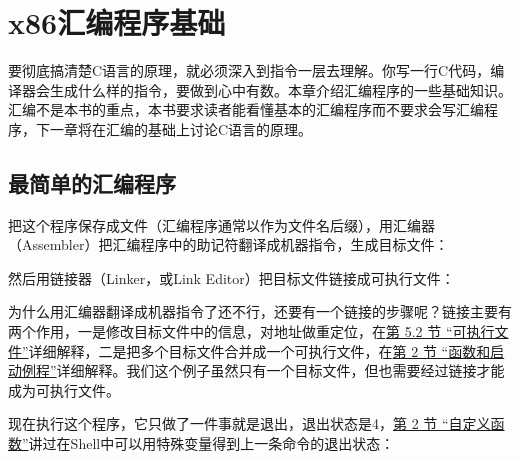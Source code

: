 

\chapter{x86汇编程序基础}
%
要彻底搞清楚C语言的原理，就必须深入到指令一层去理解。你写一行C代码，编译器会生成什么样的指令，要做到心中有数。本章介绍汇编程序的一些基础知识。汇编不是本书的重点，本书要求读者能看懂基本的汇编程序而不要求会写汇编程序，下一章将在汇编的基础上讨论C语言的原理。




\section{最简单的汇编程序}
%



把这个程序保存成文件（汇编程序通常以作为文件名后缀），用汇编器（Assembler）把汇编程序中的助记符翻译成机器指令，生成目标文件：




然后用链接器（Linker，或Link Editor）把目标文件链接成可执行文件：




为什么用汇编器翻译成机器指令了还不行，还要有一个链接的步骤呢？链接主要有两个作用，一是修改目标文件中的信息，对地址做重定位，在\hyperlink{db.ch18s05.id2771639}{第 5.\BookSplit{}2 节 “可执行文件”}详细解释，二是把多个目标文件合并成一个可执行文件，在\hyperlink{db.ch19s02.id2776173}{第 2 节 “函数和启动例程”}详细解释。我们这个例子虽然只有一个目标文件，但也需要经过链接才能成为可执行文件。



现在执行这个程序，它只做了一件事就是退出，退出状态是4，\hyperlink{db.ch03s02.id2712975}{第 2 节 “自定义函数”}讲过在Shell中可以用特殊变量得到上一条命令的退出状态：


